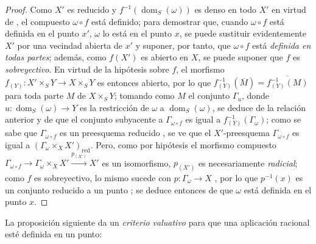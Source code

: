 \begin{proof}
Como $X'$ es reducido y $f^{-1}(\operatorname{dom}_S(\omega))$ es denso en todo $X'$ en virtud de , el compuesto $\omega\circ f$ está definido; para demostrar que, cuando $\omega\circ f$ está definida en el punto $x'$, $\omega$ lo está en el punto $x$, se puede sustituir evidentemente $X'$ por una vecindad abierta de $x'$ y suponer, por tanto, que $\omega\circ f$ está \emph{definida en todas partes}; además, como $f(X')$ es abierto en $X$, se puede suponer que $f$ es \emph{sobreyectivo}.
En virtud de la hipótesis sobre $f$, el morfismo $f_{(Y)}:X'\times_S Y\to X\times_S Y$ es entonces abierto, por lo que $f_{(Y)}^{-1}(\overline{M})=\overline{f_{(Y)}^{-1}(M)}$ para toda parte $M$ de $X\times_S Y$; tomando como $M$ el conjunto $\Gamma_u$, donde $u:\operatorname{dom}_S(\omega)\to Y$ es la restricción de $\omega$ a $\operatorname{dom}_S(\omega)$, se deduce de la relación anterior y de  que el conjunto subyacente a $\Gamma_{\omega\circ f}$ es igual a $f_{(Y)}^{-1}(\Gamma_\omega)$; como se sabe
que $\Gamma_{\omega\circ f}$ es un preesquema reducido , se ve que el $X'$-preesquema $\Gamma_{\omega\circ f}$ es igual a $(\Gamma_\omega\times_X X')_\mathrm{red}$.
Pero, como por hipótesis el morfismo compuesto $\Gamma_{\omega\circ f}\to\Gamma_\omega\times_X X'\xrightarrow{p_{(X')}}X'$ es un isomorfismo, $p_{(X')}$ es necesariamente \emph{radicial}; como $f$ es sobreyectivo, lo mismo sucede con $p:\Gamma_\omega\to X$ , por lo que $p^{-1}(x)$ es un conjunto reducido a un punto ; se deduce entonces de  que $\omega$ está definida en el punto $x$.
\end{proof}

La proposición siguiente da un \emph{criterio valuativo} para que una aplicación racional esté definida en un punto:

